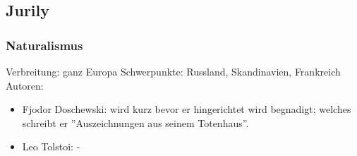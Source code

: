 \documentclass[a4paper]{article}
\begin{document}
\subsection{Jurily}

\subsubsection{Naturalismus}

Verbreitung: ganz Europa
Schwerpunkte: Russland, Skandinavien, Frankreich
Autoren: 
\begin{itemize}
\item Fjodor Doschewski: wird kurz bevor er hingerichtet wird begnadigt; welches schreibt er ''Auszeichnungen aus seinem Totenhaus''. 
\item Leo Tolstoi: -
\end{itemize}
\end{document}
